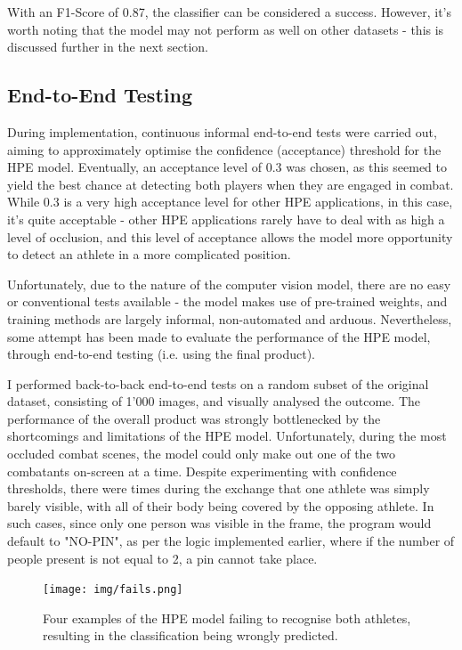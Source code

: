 \documentclass[a4paper, oneside, 11pt]{article}
\begin{document}
With an F1-Score of 0.87, the classifier can be considered a success. However, it's worth noting that the model may not perform as well on other datasets - this is discussed further in the next section.

\subsection{End-to-End Testing}
During implementation, continuous informal end-to-end tests were carried out, aiming to approximately optimise the confidence (acceptance) threshold for the HPE model. Eventually, an acceptance level of 0.3 was chosen, as this seemed to yield the best chance at detecting both players when they are engaged in combat. While 0.3 is a very high acceptance level for other HPE applications, in this case, it's quite acceptable - other HPE applications rarely have to deal with as high a level of occlusion, and this level of acceptance allows the model more opportunity to detect an athlete in a more complicated position.

\bigskip
\noindent
Unfortunately, due to the nature of the computer vision model, there are no easy or conventional tests available - the model makes use of pre-trained weights, and training methods are largely informal, non-automated and arduous. Nevertheless, some attempt has been made to evaluate the performance of the HPE model, through end-to-end testing (i.e. using the final product).

\bigskip
\noindent
I performed back-to-back end-to-end tests on a random subset of the original dataset, consisting of 1'000 images, and visually analysed the outcome. The performance of the overall product was strongly bottlenecked by the shortcomings and limitations of the HPE model. Unfortunately, during the most occluded combat scenes, the model could only make out one of the two combatants on-screen at a time. Despite experimenting with confidence thresholds, there were times during the exchange that one athlete was simply barely visible, with all of their body being covered by the opposing athlete. In such cases, since only one person was visible in the frame, the program would default to "NO-PIN", as per the logic implemented earlier, where if the number of people present is not equal to 2, a pin cannot take place.

\bigskip
\begin{figure}[ht]
    \centering
    \texttt{[image: img/fails.png]}
    \caption{Four examples of the HPE model failing to recognise both athletes, resulting in the classification being wrongly predicted.}
    \label{fig:fails}
\end{figure}
\end{document}
